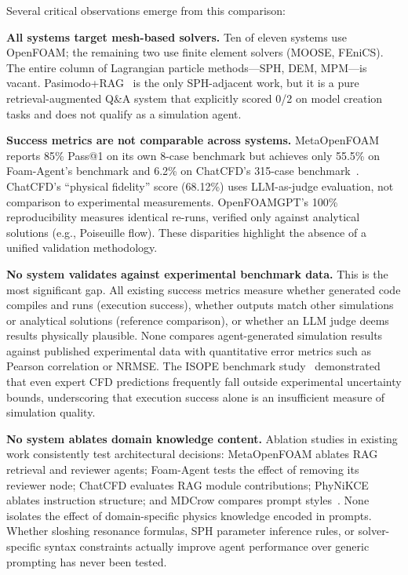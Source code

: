 \documentclass[11pt]{article}
\begin{document}
Several critical observations emerge from this comparison:

\textbf{All systems target mesh-based solvers.} Ten of eleven systems use OpenFOAM; the remaining two use finite element solvers (MOOSE, FEniCS). The entire column of Lagrangian particle methods---SPH, DEM, MPM---is vacant. Pasimodo+RAG~\citep{pasimodo2025} is the only SPH-adjacent work, but it is a pure retrieval-augmented Q\&A system that explicitly scored 0/2 on model creation tasks and does not qualify as a simulation agent.

\textbf{Success metrics are not comparable across systems.} MetaOpenFOAM reports 85\% Pass@1 on its own 8-case benchmark but achieves only 55.5\% on Foam-Agent's benchmark and 6.2\% on ChatCFD's 315-case benchmark~\citep{chatcfd2026}. ChatCFD's ``physical fidelity'' score (68.12\%) uses LLM-as-judge evaluation, not comparison to experimental measurements. OpenFOAMGPT's 100\% reproducibility measures identical re-runs, verified only against analytical solutions (e.g., Poiseuille flow). These disparities highlight the absence of a unified validation methodology.

\textbf{No system validates against experimental benchmark data.} This is the most significant gap. All existing success metrics measure whether generated code compiles and runs (execution success), whether outputs match other simulations or analytical solutions (reference comparison), or whether an LLM judge deems results physically plausible. None compares agent-generated simulation results against published experimental data with quantitative error metrics such as Pearson correlation or NRMSE. The ISOPE benchmark study~\citep{isope2012sloshing} demonstrated that even expert CFD predictions frequently fall outside experimental uncertainty bounds, underscoring that execution success alone is an insufficient measure of simulation quality.

\textbf{No system ablates domain knowledge content.} Ablation studies in existing work consistently test architectural decisions: MetaOpenFOAM ablates RAG retrieval and reviewer agents; Foam-Agent tests the effect of removing its reviewer node; ChatCFD evaluates RAG module contributions; PhyNiKCE ablates instruction structure; and MDCrow compares prompt styles~\citep{mdcrow2025}. None isolates the effect of domain-specific physics knowledge encoded in prompts. Whether sloshing resonance formulas, SPH parameter inference rules, or solver-specific syntax constraints actually improve agent performance over generic prompting has never been tested.
\end{document}
